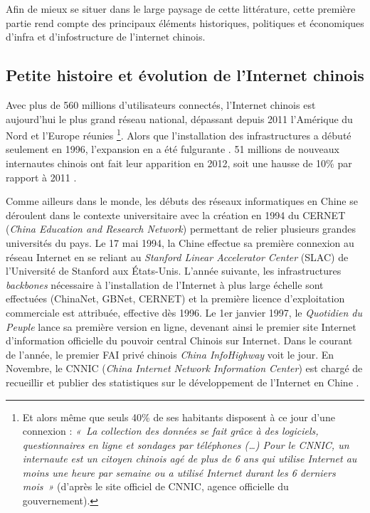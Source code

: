 Afin de mieux se situer dans le large paysage de cette littérature, cette première partie rend compte des principaux éléments historiques, politiques et économiques d’infra et d’infostructure de l’internet chinois.

\subsection[Petite histoire et évolution de l’Internet chinois]{Petite histoire et évolution de l’Internet chinois}

Avec plus de 560 millions d’utilisateurs connectés, l’Internet chinois est aujourd’hui le plus grand réseau national, dépassant depuis 2011 l’Amérique du Nord et l’Europe réunies \citep{CNNIC2012}\footnote{Et alors même que seuls 40\% de ses habitants disposent à ce jour d’une connexion : \textit{« La collection des données se fait grâce à des logiciels, questionnaires en ligne et sondages par téléphones (…) Pour le CNNIC, un internaute est un citoyen chinois agé de plus de 6 ans qui utilise Internet au moins une heure par semaine ou a utilisé Internet durant les 6 derniers mois »} (d’après le site officiel de CNNIC, agence officielle du gouvernement).}. Alors que l’installation des infrastructures a débuté seulement en 1996, l’expansion en a été fulgurante \citep{Fang2006}. 51 millions de nouveaux internautes chinois ont fait leur apparition en 2012, soit une hausse de 10\% par rapport à 2011 \citep{CNNIC2012}. 

Comme ailleurs dans le monde, les débuts des réseaux informatiques en Chine se déroulent dans le contexte universitaire avec la création en 1994 du CERNET (\textit{China Education and Research Network}) permettant de relier plusieurs grandes universités du pays. Le 17 mai 1994, la Chine effectue sa première connexion au réseau Internet en se reliant au \textit{Stanford Linear Accelerator Center} (SLAC) de l’Université de Stanford aux États-Unis. L’année suivante, les infrastructures \textit{backbones} nécessaire à l’installation de l’Internet à plus large échelle sont effectuées (ChinaNet, GBNet, CERNET) et la première licence d’exploitation commerciale est attribuée, effective dès 1996. Le 1er janvier 1997, le \textit{Quotidien du Peuple} lance sa première version en ligne, devenant ainsi le premier site Internet d’information officielle du pouvoir central Chinois sur Internet. Dans le courant de l’année, le premier FAI privé chinois \textit{China InfoHighway} voit le jour. En Novembre, le CNNIC (\textit{China Internet Network Information Center}) est chargé de recueillir et publier des statistiques sur le développement de l’Internet en Chine \citep{Dai2007}.

